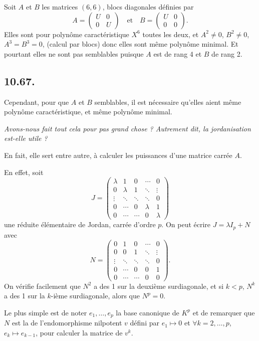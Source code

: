 Soit $A$ et $B$ les matrices $(6,6)$, blocs diagonales définies par
\[
A=\begin{pmatrix}U&0\\0&U\end{pmatrix}
\quad\text{et}\quad
B=\begin{pmatrix}U&0\\0&0\end{pmatrix}.
\]
Elles sont pour polynôme caractéristique $X^6$ toutes les deux, et $A^2\ne0$, $B^2\ne0$, $A^3=B^3=0$, (calcul par blocs) donc elles sont même polynôme minimal. Et pourtant elles ne sont pas semblables puisque $A$ est de rang 4 et $B$ de rang 2.

\subsection*{10.67.}
Cependant, pour que $A$ et $B$  semblables, il est nécessaire qu'elles aient même polynôme caractéristique, et même polynôme minimal.

\medskip\noindent\textit{Avons-nous fait tout cela pour pas grand chose ? Autrement dit, la jordanisation est-elle utile ?}

En fait, elle sert entre autre, à calculer les puissances d'une matrice carrée $A$.

En effet, soit
\[
J=\begin{pmatrix}
\lambda&1&0&\cdots&0\\
0&\lambda&1&\ddots&\vdots\\
\vdots&\ddots&\ddots&\ddots&0\\
0&\cdots&0&\lambda&1\\
0&\cdots&\cdots&0&\lambda
\end{pmatrix}
\]
une réduite élémentaire de Jordan, carrée d'ordre $p$. On peut écrire $J=\lambda I_p+N$ avec
\[
N=\begin{pmatrix}
0&1&0&\cdots&0\\
0&0&1&\ddots&\vdots\\
\vdots&\ddots&\ddots&\ddots&0\\
0&\cdots&0&0&1\\
0&\cdots&\cdots&0&0
\end{pmatrix}.
\]
On vérifie facilement que $N^2$ a des 1 sur la deuxième surdiagonale, et si $k<p$, $N^k$ a des 1 sur la $k$-ième surdiagonale, alors que $N^p=0$.

Le plus simple est de noter $e_1,\ldots,e_p$ la base canonique de $K^p$ et de remarquer que $N$ est la  de l'endomorphisme nilpotent $v$ défini par $e_1\mapsto0$ et $\forall k=2,\ldots,p$, $e_k\mapsto e_{k-1}$, pour calculer la matrice de $v^k$.

